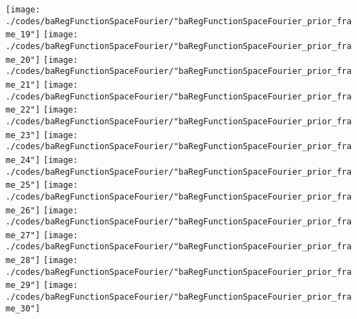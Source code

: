 \begin{frame}{\insertsection}
\begin{center}
{\begin{animateinline}{15}
				 \texttt{[image: ./codes/baRegFunctionSpaceFourier/"baRegFunctionSpaceFourier\_prior\_frame\_19"]}\newframe
				 \texttt{[image: ./codes/baRegFunctionSpaceFourier/"baRegFunctionSpaceFourier\_prior\_frame\_20"]}\newframe
				 \texttt{[image: ./codes/baRegFunctionSpaceFourier/"baRegFunctionSpaceFourier\_prior\_frame\_21"]}\newframe
				 \texttt{[image: ./codes/baRegFunctionSpaceFourier/"baRegFunctionSpaceFourier\_prior\_frame\_22"]}\newframe
				 \texttt{[image: ./codes/baRegFunctionSpaceFourier/"baRegFunctionSpaceFourier\_prior\_frame\_23"]}\newframe
				 \texttt{[image: ./codes/baRegFunctionSpaceFourier/"baRegFunctionSpaceFourier\_prior\_frame\_24"]}\newframe
				 \texttt{[image: ./codes/baRegFunctionSpaceFourier/"baRegFunctionSpaceFourier\_prior\_frame\_25"]}\newframe
				 \texttt{[image: ./codes/baRegFunctionSpaceFourier/"baRegFunctionSpaceFourier\_prior\_frame\_26"]}\newframe
				 \texttt{[image: ./codes/baRegFunctionSpaceFourier/"baRegFunctionSpaceFourier\_prior\_frame\_27"]}\newframe
				 \texttt{[image: ./codes/baRegFunctionSpaceFourier/"baRegFunctionSpaceFourier\_prior\_frame\_28"]}\newframe
				 \texttt{[image: ./codes/baRegFunctionSpaceFourier/"baRegFunctionSpaceFourier\_prior\_frame\_29"]}\newframe
				 \texttt{[image: ./codes/baRegFunctionSpaceFourier/"baRegFunctionSpaceFourier\_prior\_frame\_30"]}
			 \end{animateinline}
			}
	\end{center}
    
\end{frame}

